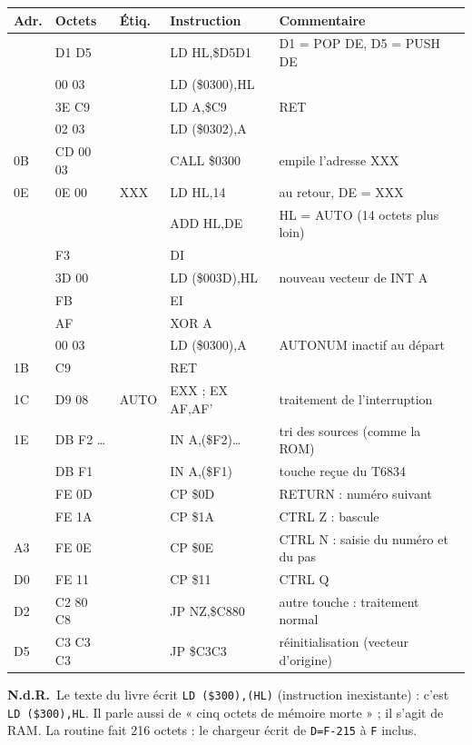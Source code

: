 \documentclass[a4paper,10pt]{article}
\makeatletter
\newcommand{\nota}[1]{\textcolor{red!60!black}{\small\textbf{N.d.R.}~#1}}
\newenvironment{asm}
  {\small\begin{longtable}{@{}>{\ttfamily}l>{\ttfamily}l>{\ttfamily}l>{\ttfamily}l>{\raggedright\arraybackslash}p{6.2cm}@{}}
   \toprule
   \normalfont\bfseries Adr. & \normalfont\bfseries Octets & \normalfont\bfseries Étiq. & \normalfont\bfseries Instruction & \textbf{Commentaire}\\
   \midrule\endhead
   \bottomrule\endfoot}
  {\end{longtable}}
\makeatother
\begin{document}
\begin{asm}
00 & 21 D1 D5 & & LD HL,\$D5D1   & D1 = POP DE, D5 = PUSH DE \\
03 & 22 00 03 & & LD (\$0300),HL & \\
06 & 3E C9    & & LD A,\$C9      & RET \\
08 & 32 02 03 & & LD (\$0302),A  & \\
0B & CD 00 03 & & CALL \$0300    & empile l'adresse XXX \\
0E & 21 0E 00 & XXX & LD HL,14   & au retour, DE = XXX \\
11 & 19       & & ADD HL,DE      & HL = AUTO (14 octets plus loin) \\
12 & F3       & & DI             & \\
13 & 22 3D 00 & & LD (\$003D),HL & nouveau vecteur de INT A \\
16 & FB       & & EI             & \\
17 & AF       & & XOR A          & \\
18 & 32 00 03 & & LD (\$0300),A  & AUTONUM inactif au départ \\
1B & C9       & & RET            & \\
1C & D9 08    & AUTO & EXX ; EX AF,AF' & traitement de l'interruption \\
1E & DB F2 \dots & & IN A,(\$F2)\dots & tri des sources (comme la ROM) \\
33 & DB F1    & & IN A,(\$F1)    & touche reçue du T6834 \\
35 & FE 0D    & & CP \$0D        & RETURN : numéro suivant \\
84 & FE 1A    & & CP \$1A        & CTRL Z : bascule \\
A3 & FE 0E    & & CP \$0E        & CTRL N : saisie du numéro et du pas \\
D0 & FE 11    & & CP \$11        & CTRL Q \\
D2 & C2 80 C8 & & JP NZ,\$C880  & autre touche : traitement normal \\
D5 & C3 C3 C3 & & JP \$C3C3      & réinitialisation (vecteur d'origine) \\
\end{asm}
\nota{Le texte du livre écrit \texttt{LD (\$300),(HL)} (instruction
inexistante) : c'est \texttt{LD (\$300),HL}. Il parle aussi de « cinq octets
de mémoire morte » ; il s'agit de RAM. La routine fait 216 octets : le
chargeur écrit de \texttt{D=F-215} à \texttt{F} inclus.}
\end{document}
